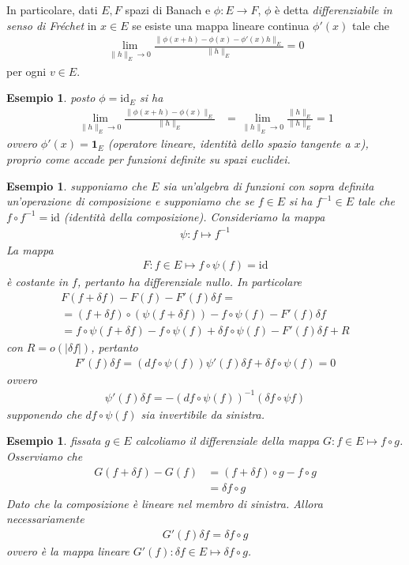 \documentclass[twoside, 11pt]{amsbook}
\newcommand{\0}{{(0)}}
\newcommand{\3}{{(3)}}
\theoremstyle{colonplain}
\theoremstyle{colondefinition}
\newtheorem{ex}[thm]{Esempio}
\theoremstyle{colonremark}
\numberwithin{equation}{chapter}
\begin{document}
In particolare, dati $E, F$ spazi di Banach e $\phi : E \longrightarrow F$, $\phi$ è detta \textit{differenziabile in senso di Fréchet} in $x \in E$ se esiste una mappa lineare continua $\phi'(x)$ tale che
\begin{align}
    \lim_{\|h\|_E \rightarrow 0} \frac{\|\phi(x + h) - \phi(x) - \phi'(x)h\|_E}{\|h\|_E} = 0 
\end{align}
per ogni $v \in E$.
\begin{ex} posto $\phi = \mathrm{id}_E$ si ha
\begin{align}
    \lim_{\|h\|_E \rightarrow 0}\frac{\|\phi(x + h) - \phi(x)\|_E}{\|h\|_E} &= \lim_{\|h\|_E \rightarrow 0}\frac{\|h\|_E}{\|h\|_E} = 1 
\end{align}
ovvero $\phi'(x) = \mathbf{1}_E$ (operatore lineare, identità dello spazio tangente a $x$), proprio come accade per funzioni definite su spazi euclidei.
\end{ex}
\begin{ex} supponiamo che $E$ sia un'algebra di funzioni con sopra definita un'operazione di composizione e supponiamo che se $f \in E$ si ha $f^{-1} \in E$ tale che $f \circ f^{-1} = \mathrm{id}$ (identità della composizione). Consideriamo la mappa
\begin{align}
    \psi : f \mapsto f^{-1}
\end{align}
La mappa
\begin{align}
    F : f \in E \mapsto f \circ \psi(f) = \mathrm{id}
\end{align}
è costante in $f$, pertanto ha differenziale nullo. In particolare
\begin{gather}
    F(f + \delta f) - F(f) - F'(f)\delta f = \\
    = (f + \delta f) \circ (\psi(f + \delta f)) - f \circ \psi(f) - F'(f)\delta f \\
    = f \circ \psi(f + \delta f) - f \circ \psi(f) + \delta f \circ \psi(f) - F'(f)\delta f + R
\end{gather}
con $R = o(|\delta f|)$, pertanto
\begin{align}
    F'(f)\delta f = (df \circ \psi(f))\psi'(f)\delta f + \delta f \circ \psi(f) = 0
\end{align}
ovvero
\begin{align}
    \psi'(f)\delta f = -(df \circ \psi(f))^{-1}(\delta f \circ \psi f)
\end{align}
supponendo che $df \circ \psi(f)$ sia invertibile da sinistra.
\end{ex}
\begin{ex} fissata $g \in E$ calcoliamo il differenziale della mappa $G : f \in E \mapsto f \circ g$. Osserviamo che
\begin{align}
    G(f + \delta f) - G(f) &= (f + \delta f) \circ g - f \circ g \\
    &= \delta f \circ g
\end{align}
Dato che la composizione è lineare nel membro di sinistra. Allora necessariamente
\begin{align}
    G'(f)\delta f = \delta f \circ g
\end{align}
ovvero è la mappa lineare $G'(f) : \delta f \in E \mapsto \delta f \circ g$.
\end{ex}
\end{document}
